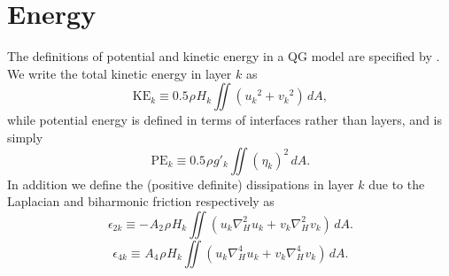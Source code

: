 \documentclass[11pt, a4paper,twoside]{article}
\newcommand{\etb}[2]{{{}^{#1}\eta_{#2}}}
\newcommand{\rhb}[1]{{{}^{#1}\rho}}
\newcommand{\gp}[2]{{}^{#1}g'_{#2}}
\newcommand{\uu}[2]{{{}^{#1}u_{#2}}}
\newcommand{\vv}[2]{{{}^{#1}v_{#2}}}
\newcommand{\HH}[2]{{{}^{#1}H_{#2}}}
\newcommand{\at}[1]{{{}^{#1}A_2}}
\newcommand{\ah}[1]{{{}^{#1}A_4}}
\newcommand{\pe}[2]{{}^{#1}\textrm{PE}_{#2}}
\newcommand{\ke}[2]{{}^{#1}\textrm{KE}_{#2}}
\newcommand{\eps}[2]{{}^{#1}\epsilon_{#2}}
\numberwithin{equation}{section}
\begin{document}
\section{Energy}
The definitions of potential and kinetic energy in a QG model are specified by \citet{holland:78}.
We write the total kinetic energy in layer $k$ as
\[\ke{}{k} \equiv 0.5 \rhb{}\HH{}{k} \iint (\uu{}{k}^2 + \vv{}{k}^2 )\, dA,\]
while potential energy is defined in terms of interfaces rather than layers, and is simply
\[\pe{}{k} \equiv 0.5 \rhb{}\gp{}{k} \iint \left(\etb{}{k}\right)^2 \, dA.\]
In addition we define the (positive definite) dissipations in layer $k$ due to the Laplacian and biharmonic friction respectively as
\[\eps{}{2k} \equiv - \at{} \rhb{} \HH{}{k}  \iint (\uu{}{k} \nabla_H^2 \uu{}{k} + \vv{}{k} \nabla_H^2 \vv{}{k} )\,dA.\]
\[\eps{}{4k} \equiv \ah{} \rhb{} \HH{}{k}  \iint (\uu{}{k} \nabla_H^4 \uu{}{k} + \vv{}{k} \nabla_H^4 \vv{}{k} )\,dA.\]
\end{document}
